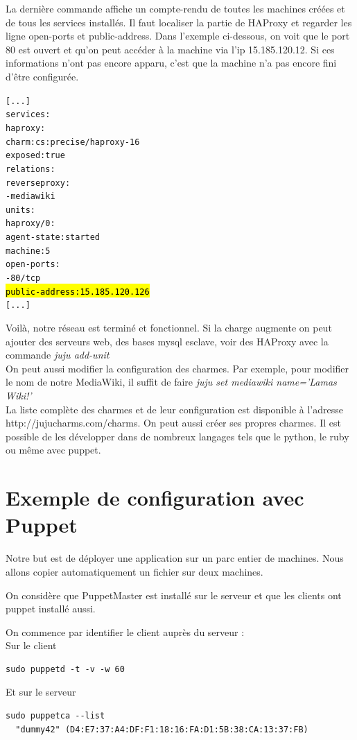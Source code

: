 \documentclass[a4paper,oneside]{report}
\begin{document}
La dernière commande affiche un compte-rendu de toutes les machines créées et de tous les services installés. Il faut localiser la partie de HAProxy et regarder les ligne open-ports et public-address. Dans l'exemple ci-dessous, on voit que le port 80 est ouvert et qu'on peut accéder à la machine via l'ip 15.185.120.12. Si ces informations n'ont pas encore apparu, c'est que la machine n'a pas encore fini d'être configurée. 
\begin{alltt}
[...]
services:
  haproxy:
    charm: cs:precise/haproxy-16
    exposed: true
    relations:
      reverseproxy:
      - mediawiki
    units:
      haproxy/0:
        agent-state: started
        machine: 5
        open-ports:
        - 80/tcp
        \hl{public-address: 15.185.120.126}
[...]
\end{alltt}

Voilà, notre réseau est terminé et fonctionnel. Si la charge augmente on peut ajouter des serveurs web, des bases mysql esclave, voir des HAProxy avec la commande \emph{juju add-unit}\\
On peut aussi modifier la configuration des charmes. Par exemple, pour modifier le nom de notre MediaWiki, il suffit de faire \emph{juju set mediawiki name='Lamas Wiki!'}\\
La liste complète des charmes et de leur configuration est disponible à l'adresse http://jujucharms.com/charms.
On peut aussi créer ses propres charmes. Il est possible de les développer dans de nombreux langages tels que le python, le ruby ou même avec puppet.
\newpage
\section{Exemple de configuration avec Puppet} \label{auto:puppet}
Notre but est de déployer une application sur un parc entier de machines.
Nous allons copier automatiquement un fichier sur deux machines.

On considère que PuppetMaster est installé sur le serveur et que les clients ont puppet installé aussi.


On commence par identifier le client auprès du serveur :\\
Sur le client
\begin{verbatim}
sudo puppetd -t -v -w 60
\end{verbatim}

Et sur le serveur
\begin{verbatim}
sudo puppetca --list
  "dummy42" (D4:E7:37:A4:DF:F1:18:16:FA:D1:5B:38:CA:13:37:FB)
\end{verbatim}
\end{document}
